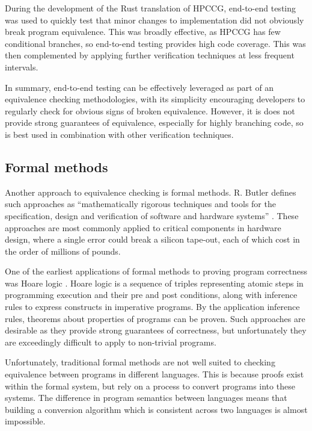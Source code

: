 During the development of the Rust translation of HPCCG, end-to-end testing was used to quickly test that minor changes to implementation did not obviously break program equivalence. This was broadly effective, as HPCCG has few conditional branches, so end-to-end testing provides high code coverage. This was then complemented by applying further verification techniques at less frequent intervals.

In summary, end-to-end testing can be effectively leveraged as part of an equivalence checking methodologies, with its simplicity encouraging developers to regularly check for obvious signs of broken equivalence. However, it is does not provide strong guarantees of equivalence, especially for highly branching code, so is best used in combination with other verification techniques.

\subsection{Formal methods}
\label{sec:equivalence-formal-methods}

Another approach to equivalence checking is formal methods. R. Butler defines such approaches as ``mathematically rigorous techniques and tools for the specification, design and verification of software and hardware systems'' \cite{LangleyFormalMethods}. These approaches are most commonly applied to critical components in hardware design, where a single error could break a silicon tape-out, each of which cost in the order of millions of pounds.

One of the earliest applications of formal methods to proving program correctness was Hoare logic \cite{hoareAxiomaticBasisComputer1969}. Hoare logic is a sequence of triples representing atomic steps in programming execution and their pre and post conditions, along with inference rules to express constructs in imperative programs. By the application inference rules, theorems about properties of programs can be proven. Such approaches are desirable as they provide strong guarantees of correctness, but unfortunately they are exceedingly difficult to apply to non-trivial programs.

Unfortunately, traditional formal methods are not well suited to checking equivalence between programs in different languages. This is because proofs exist within the formal system, but rely on a process to convert programs into these systems. The difference in program semantics between languages means that building a conversion algorithm which is consistent across two languages is almost impossible.

